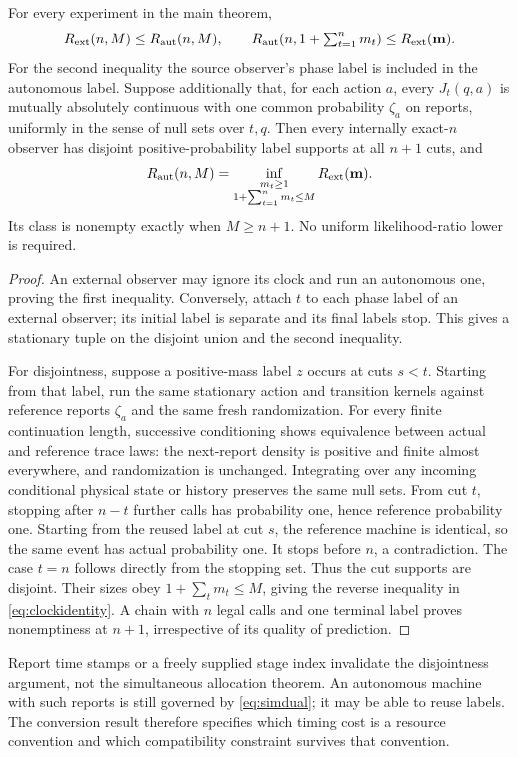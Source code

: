 \begin{proposition}\label{prop:clock}
For every experiment in the main theorem,
\begin{equation}\label{eq:conversion}
 R_{\mathrm{ext}}(n,M)\le R_{\mathrm{aut}}(n,M),\qquad
 R_{\mathrm{aut}}(n,1+\textstyle\sum_{t=1}^n m_t)\le R_{\mathrm{ext}}(\mathbf m).
\end{equation}
For the second inequality the source observer's phase label is included in the autonomous label. Suppose additionally that, for each action $a$, every $J_t(q,a)$ is mutually absolutely continuous with one common probability $\zeta_a$ on reports, uniformly in the sense of null sets over $t,q$. Then every internally exact-$n$ observer has disjoint positive-probability label supports at all $n+1$ cuts, and
\begin{equation}\label{eq:clockidentity}
 R_{\mathrm{aut}}(n,M)=
 \inf_{\substack{m_t\ge1\\1+\sum_{t=1}^n m_t\le M}} R_{\mathrm{ext}}(\mathbf m).
\end{equation}
Its class is nonempty exactly when $M\ge n+1$. No uniform likelihood-ratio lower is required.
\end{proposition}
\begin{proof}
An external observer may ignore its clock and run an autonomous one, proving the first inequality. Conversely, attach $t$ to each phase label of an external observer; its initial label is separate and its final labels stop. This gives a stationary tuple on the disjoint union and the second inequality.

For disjointness, suppose a positive-mass label $z$ occurs at cuts $s<t$. Starting from that label, run the same stationary action and transition kernels against reference reports $\zeta_a$ and the same fresh randomization. For every finite continuation length, successive conditioning shows equivalence between actual and reference trace laws: the next-report density is positive and finite almost everywhere, and randomization is unchanged. Integrating over any incoming conditional physical state or history preserves the same null sets. From cut $t$, stopping after $n-t$ further calls has probability one, hence reference probability one. Starting from the reused label at cut $s$, the reference machine is identical, so the same event has actual probability one. It stops before $n$, a contradiction. The case $t=n$ follows directly from the stopping set. Thus the cut supports are disjoint. Their sizes obey $1+\sum_tm_t\le M$, giving the reverse inequality in \eqref{eq:clockidentity}. A chain with $n$ legal calls and one terminal label proves nonemptiness at $n+1$, irrespective of its quality of prediction.
\end{proof}
Report time stamps or a freely supplied stage index invalidate the disjointness argument, not the simultaneous allocation theorem. An autonomous machine with such reports is still governed by \eqref{eq:simdual}; it may be able to reuse labels. The conversion result therefore specifies which timing cost is a resource convention and which compatibility constraint survives that convention.
